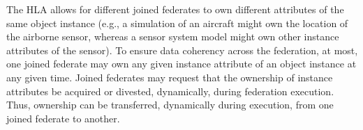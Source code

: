 The HLA allows for different joined federates to own different attributes of the same object instance (e.g., a\linebreak
simulation of an aircraft might own the location of the airborne sensor, whereas a sensor system model\linebreak
might own other instance attributes of the sensor). To ensure data coherency across the federation, at most,\linebreak
one joined federate may own any given instance attribute of an object instance at any given time. Joined\linebreak
federates may request that the ownership of instance attributes be acquired or divested, dynamically, during\linebreak
federation execution. Thus, ownership can be transferred, dynamically during execution, from one joined\linebreak
federate to another.
